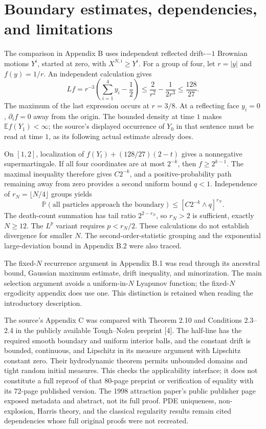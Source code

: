 \documentclass[10pt]{article}
\begin{document}
\section*{Boundary estimates, dependencies, and limitations}
The comparison in Appendix B uses independent reflected drift-\(-1\) Brownian motions \(Y^i\), started at zero, with \(X^{N,i}\geq Y^i\). For a group of four, let \(r=|y|\) and \(f(y)=1/r\). An independent calculation gives \[Lf=r^{-3}\left(\sum_{i=1}^4y_i-\frac12\right)
 \leq \frac2{r^2}-\frac1{2r^3}\leq\frac{128}{27}.\] The maximum of the last expression occurs at \(r=3/8\). At a reflecting face \(y_i=0\), \(\partial_if=0\) away from the origin. The bounded density at time \(1\) makes \(\mathbb Ef(Y_1)<\infty\); the source’s displayed occurrence of \(Y_0\) in that sentence must be read at time \(1\), as its following actual estimate already does.\par
On \([1,2]\), localization of \(f(Y_t)+(128/27)(2-t)\) gives a nonnegative supermartingale. If all four coordinates are at most \(2^{-k}\), then \(f\geq2^{k-1}\). The maximal inequality therefore gives \(C2^{-k}\), and a positive-probability path remaining away from zero provides a second uniform bound \(q<1\). Independence of \(r_N=\lfloor N/4\rfloor\) groups yields \[\mathbb P(\text{all particles approach the boundary})
 \leq [C2^{-k}\wedge q]^{r_N}.\] The death-count summation has tail ratio \(2^{2-r_N}\), so \(r_N>2\) is sufficient, exactly \(N\geq12\). The \(L^p\) variant requires \(p<r_N/2\). These calculations do not establish divergence for smaller \(N\). The second-order-statistic grouping and the exponential large-deviation bound in Appendix B.2 were also traced.\par
The fixed-\(N\) recurrence argument in Appendix B.1 was read through its ancestral bound, Gaussian maximum estimate, drift inequality, and minorization. The main selection argument avoids a uniform-in-\(N\) Lyapunov function; the fixed-\(N\) ergodicity appendix does use one. This distinction is retained when reading the introductory description.\par
The source’s Appendix C was compared with Theorem 2.10 and Conditions 2.3–2.4 in the publicly available Tough–Nolen preprint [4]. The half-line has the required smooth boundary and uniform interior balls, and the constant drift is bounded, continuous, and Lipschitz in its measure argument with Lipschitz constant zero. Their hydrodynamic theorem permits unbounded domains and tight random initial measures. This checks the applicability interface; it does not constitute a full reproof of that 80-page preprint or verification of equality with its 72-page published version. The 1998 attraction paper’s public publisher page exposed metadata and abstract, not its full proof. PDE uniqueness, non-explosion, Harris theory, and the classical regularity results remain cited dependencies whose full original proofs were not recreated.\par
\end{document}
